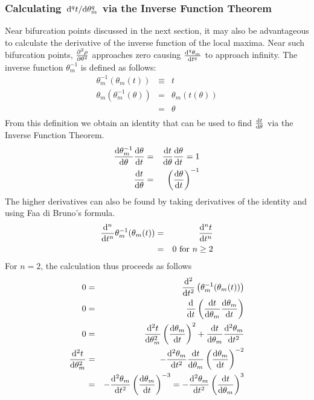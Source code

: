 \documentclass[11pt]{article} %
\begin{document}
\subsubsection{Calculating $ \dv*[q]{t}{\theta_m} $ via the Inverse Function Theorem}

Near bifurcation points discussed in the next section, it may also be advantageous to calculate the derivative of the inverse function of the local maxima. Near such bifurcation points, $ \pdv[2]{\rho}{\theta} $ approaches zero causing $ \dv[q]{\theta_m}{t} $ to approach infinity. The inverse function $ \theta_m^{-1} $ is defined as follows:
\begin{eqnarray}
	\theta_m^{-1}(\theta_m(t)) & \equiv & t \\
	\theta_m(\theta_m^{-1}(\theta)) & = & \theta_m(t(\theta)) \\
	& = & \theta \\
\end{eqnarray}
From this definition we obtain an identity that can be used to find $ \dv{t}{\theta} $ via the Inverse Function Theorem.
\begin{eqnarray}
	\dv{\theta_m^{-1}}{\theta} \dv{\theta}{t} & = & \dv{t}{\theta} \dv{\theta}{t} = 1 \\
	\dv{t}{\theta} & = & \left( \dv{\theta}{t} \right)^{-1}
\end{eqnarray}
The higher derivatives can also be found by taking derivatives of the identity and using Faa di Bruno's formula.
\begin{eqnarray}
	\dv[n]{}{t} \theta_m^{-1}(\theta_m(t)) & = & \dv[n]{t}{t} \\
	& = & 0 \mbox{ for } n \ge 2 \\
\end{eqnarray}
For $ n = 2 $, the calculation thus proceeds as follows
\begin{eqnarray}
	0 & = & \dv[2]{}{t} \left( \theta_m^{-1}(\theta_m(t)) \right)  \\
	0 & = & \dv[]{}{t} \left( \dv{t}{\theta_m} \dv{\theta_m}{t} \right) \\
	0 & = &  \dv[2]{t}{\theta_m} \left(\dv{\theta_m}{t}\right)^2 + \dv{t}{\theta_m}\dv[2]{\theta_m}{t}  \\
	\dv[2]{t}{\theta_m} & = & -\dv[2]{\theta_m}{t} \dv{t}{\theta_m} \left( \dv{\theta_m}{t} \right)^{-2} \\
	& = & -\dv[2]{\theta_m}{t} \left( \dv{\theta_m}{t} \right)^{-3} = -\dv[2]{\theta_m}{t} \left( \dv{t}{\theta_m} \right)^{3} \\
\end{eqnarray}
\end{document}
